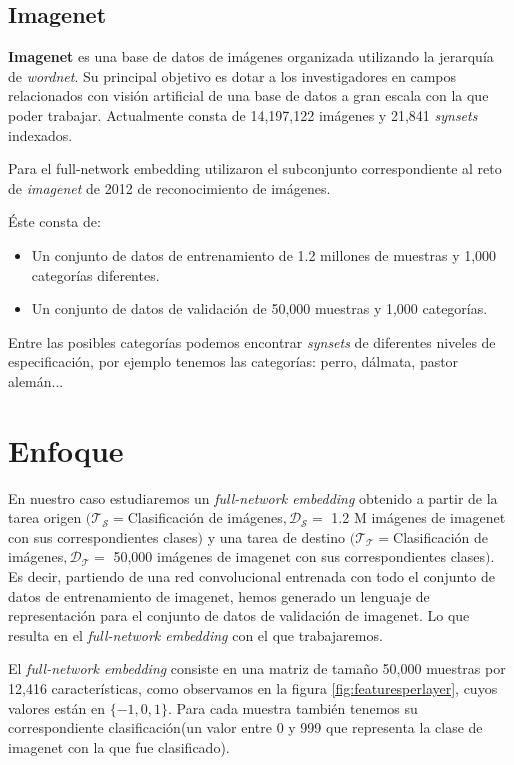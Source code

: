 \documentclass[12,twoside]{TFG-GM}
\theoremstyle{definition}
\theoremstyle{remark}
\begin{document}
\subsection{Imagenet}

\textbf{Imagenet} es una base de datos de imágenes organizada utilizando la jerarquía de \textit{wordnet}. Su principal objetivo es dotar a los investigadores en campos relacionados con visión artificial de una base de datos a gran escala con la que poder trabajar. Actualmente consta de 14,197,122 imágenes y  21,841 \textit{synsets} indexados.  

Para el full-network embedding utilizaron el subconjunto correspondiente al reto de \textit{imagenet} de 2012 de reconocimiento de imágenes. 

Éste consta de:
\begin{itemize}
\item Un conjunto de datos de entrenamiento de 1.2 millones de muestras y 1,000 categorías diferentes.
\item Un conjunto de datos de validación de 50,000 muestras y 1,000 categorías. 
\end{itemize}

Entre las posibles categorías podemos encontrar \textit{synsets} de diferentes niveles de especificación, por ejemplo tenemos las categorías: perro, dálmata, pastor alemán... 
\newpage
\section{Enfoque}

En nuestro caso estudiaremos un \textit{full-network embedding} obtenido a partir de la tarea origen  $(\mathcal{T_S} = $Clasificación de imágenes$,\mathcal{D_S} =$ 1.2 M imágenes de imagenet con sus correspondientes clases$ )$ y una tarea de destino $(\mathcal{T_T} = $Clasificación de imágenes$,\mathcal{D_T} =$ 50,000 imágenes de imagenet con sus correspondientes clases$ )$. Es decir, partiendo de una red convolucional entrenada con todo el conjunto de datos de entrenamiento de imagenet, hemos generado un lenguaje de representación para el conjunto de datos de validación de imagenet. Lo que resulta en el \textit{full-network embedding} con el que trabajaremos. 

El \textit{full-network embedding} consiste en una matriz de tamaño 50,000 muestras por 12,416 características, como observamos en la figura \ref{fig:featuresperlayer}, cuyos valores están en $\{-1,0,1\}$. Para cada muestra también tenemos su correspondiente clasificación(un valor entre 0 y 999 que representa la clase de imagenet con la que fue clasificado).
\end{document}
